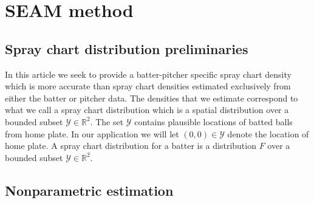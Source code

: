 \documentclass[12pt]{article}
\newcommand{\R}{\mathbb{R}}
\newcommand{\Y}{\mathcal{Y}}
\newcommand{\y}{\textbf{y}}
\begin{document}
\section{SEAM method}

\subsection{Spray chart distribution preliminaries}


In this article we seek to provide a batter-pitcher specific spray chart density which is more accurate than spray chart densities estimated exclusively from either the batter or pitcher data. The densities that we estimate correspond to what we call a spray chart distribution which is a spatial distribution over a bounded subset $\Y \in \R^2$. The set $\Y$ contains plausible locations of batted balls from home plate. In our application we will let $(0,0) \in \Y$ denote the location of home plate. A spray chart distribution for a batter is a distribution $F$ over a bounded subset $\Y \in \R^2$. %


\subsection{Nonparametric estimation}
\end{document}
